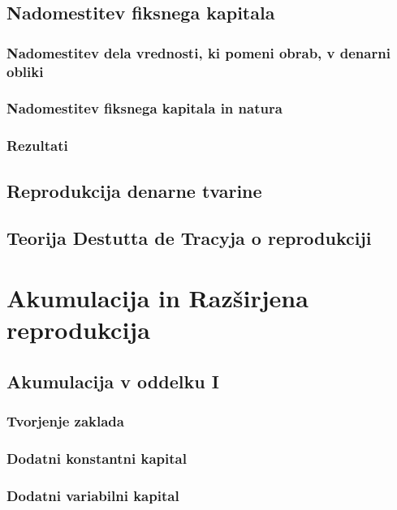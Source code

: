 \documentclass[a5paper]{scrbook}
\begin{document}
\section{Nadomestitev fiksnega kapitala}

\subsection{Nadomestitev dela vrednosti, ki pomeni obrab, v denarni obliki}

\subsection{Nadomestitev fiksnega kapitala in natura}

\subsection{Rezultati}

\section{Reprodukcija denarne tvarine}

\section{Teorija Destutta de Tracyja o reprodukciji}

\chapter{Akumulacija in Razširjena reprodukcija}

\section{Akumulacija v oddelku I}

\subsection{Tvorjenje zaklada}

\subsection{Dodatni konstantni kapital}

\subsection{Dodatni variabilni kapital}
\end{document}
